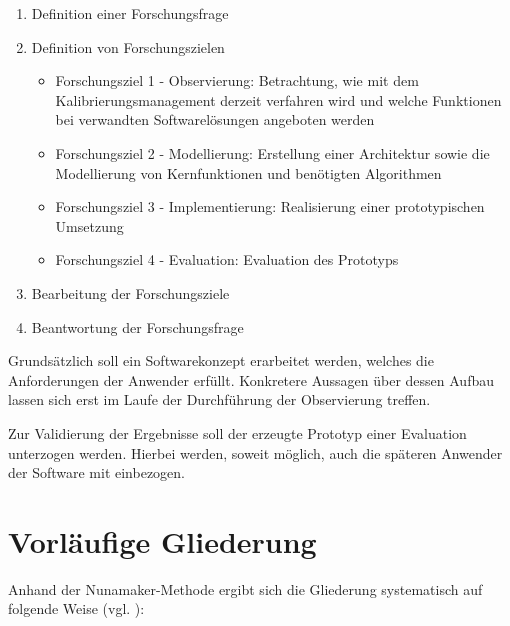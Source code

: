 \documentclass[12pt]{article} %
\begin{document}
\begin{enumerate}
  \item Definition einer Forschungsfrage
  \item Definition von Forschungszielen
        \begin{itemize}
          \item Forschungsziel 1 - Observierung: Betrachtung, wie mit dem Kalibrierungsmanagement derzeit verfahren wird und welche Funktionen bei verwandten Softwarelösungen angeboten werden
          \item Forschungsziel 2 - Modellierung: Erstellung einer Architektur sowie die Modellierung von Kernfunktionen und benötigten Algorithmen
          \item Forschungsziel 3 - Implementierung: Realisierung einer prototypischen Umsetzung
          \item Forschungsziel 4 - Evaluation: Evaluation des Prototyps
        \end{itemize}
  \item Bearbeitung der Forschungsziele
  \item Beantwortung der Forschungsfrage
\end{enumerate}

Grundsätzlich soll ein Softwarekonzept erarbeitet werden, welches die Anforderungen der Anwender erfüllt. Konkretere Aussagen über dessen Aufbau lassen sich erst im Laufe der Durchführung der Observierung treffen.

Zur Validierung der Ergebnisse soll der erzeugte Prototyp einer Evaluation unterzogen werden. Hierbei werden, soweit möglich, auch die späteren Anwender der Software mit einbezogen.

\section{Vorläufige Gliederung}
Anhand der Nunamaker-Methode ergibt sich die Gliederung systematisch auf folgende Weise (vgl. \cite{J.F.Nunamaker.1990}):
\end{document}
